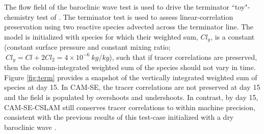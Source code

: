 \documentclass[twocol]{ametsoc}
\begin{document}
{\color{red}The flow field of the baroclinic wave test is used to drive the terminator ``toy"-chemistry test of \cite{LCLVT2015GMD,LTOUNGK2017MWR}. The terminator test is used to assess linear-correlation preservation using two reactive species advected across the terminator line. The model is initialized with species for which their weighted sum, $Cl_y$, is a constant (constant surface pressure and constant mixing ratio;$\ Cl_y = Cl + 2Cl_2 = 4\times 10^{-6}\ kg/kg$), such that if tracer correlations are preserved, then the column-integrated weighted sum of the species should not vary in time. Figure \ref{fig:term} provides a snapshot of the vertically integrated weighted sum of species at day 15. In CAM-SE, the tracer correlations are not preserved at day 15 and the field is populated by overshoots and undershoots. In contrast, by day 15, CAM-SE-CSLAM still conserves tracer correlations to within machine precision, consistent with the previous results of this test-case initialized with a dry baroclinic wave \citep{LTOUNGK2017MWR}.} 
\end{document}
